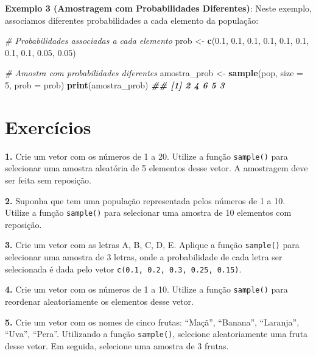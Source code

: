 \documentclass[
]{book}
\newenvironment{Shaded}{\begin{snugshade}}{\end{snugshade}}
\newcommand{\AttributeTok}[1]{\textcolor[rgb]{0.13,0.29,0.53}{#1}}
\newcommand{\CommentTok}[1]{\textcolor[rgb]{0.56,0.35,0.01}{\textit{#1}}}
\newcommand{\DecValTok}[1]{\textcolor[rgb]{0.00,0.00,0.81}{#1}}
\newcommand{\DocumentationTok}[1]{\textcolor[rgb]{0.56,0.35,0.01}{\textbf{\textit{#1}}}}
\newcommand{\FloatTok}[1]{\textcolor[rgb]{0.00,0.00,0.81}{#1}}
\newcommand{\FunctionTok}[1]{\textcolor[rgb]{0.13,0.29,0.53}{\textbf{#1}}}
\newcommand{\NormalTok}[1]{#1}
\newcommand{\OtherTok}[1]{\textcolor[rgb]{0.56,0.35,0.01}{#1}}
\begin{document}
\textbf{Exemplo 3 (Amostragem com Probabilidades Diferentes)}: Neste exemplo,
associamos diferentes probabilidades a cada elemento da população:

\begin{Shaded}
\begin{Highlighting}[]
\CommentTok{\# Probabilidades associadas a cada elemento}
\NormalTok{prob }\OtherTok{\textless{}{-}} \FunctionTok{c}\NormalTok{(}\FloatTok{0.1}\NormalTok{, }\FloatTok{0.1}\NormalTok{, }\FloatTok{0.1}\NormalTok{, }\FloatTok{0.1}\NormalTok{, }\FloatTok{0.1}\NormalTok{, }\FloatTok{0.1}\NormalTok{, }\FloatTok{0.1}\NormalTok{, }\FloatTok{0.1}\NormalTok{, }\FloatTok{0.05}\NormalTok{, }\FloatTok{0.05}\NormalTok{)}

\CommentTok{\# Amostra com probabilidades diferentes}
\NormalTok{amostra\_prob }\OtherTok{\textless{}{-}} \FunctionTok{sample}\NormalTok{(pop, }\AttributeTok{size =} \DecValTok{5}\NormalTok{, }\AttributeTok{prob =}\NormalTok{ prob)}
\FunctionTok{print}\NormalTok{(amostra\_prob)}
\DocumentationTok{\#\# [1] 2 4 6 5 3}
\end{Highlighting}
\end{Shaded}

\section{Exercícios}\label{exercuxedcios-21}

\textbf{1.} Crie um vetor com os números de 1 a 20. Utilize a função
\texttt{sample()} para selecionar uma amostra aleatória de 5 elementos desse
vetor. A amostragem deve ser feita sem reposição.

\textbf{2.} Suponha que tem uma população representada pelos números de 1 a
10. Utilize a função \texttt{sample()} para selecionar uma amostra de 10
elementos com reposição.

\textbf{3.} Crie um vetor com as letras A, B, C, D, E. Aplique a função
\texttt{sample()} para selecionar uma amostra de 3 letras, onde a probabilidade
de cada letra ser selecionada é dada pelo vetor
\texttt{c(0.1,\ 0.2,\ 0.3,\ 0.25,\ 0.15)}.

\textbf{4.} Crie um vetor com os números de 1 a 10. Utilize a função
\texttt{sample()} para reordenar aleatoriamente os elementos desse vetor.

\textbf{5.} Crie um vetor com os nomes de cinco frutas: ``Maçã'', ``Banana'',
``Laranja'', ``Uva'', ``Pera''. Utilizando a função \texttt{sample()}, selecione
aleatoriamente uma fruta desse vetor. Em seguida, selecione uma amostra
de 3 frutas.
\end{document}
